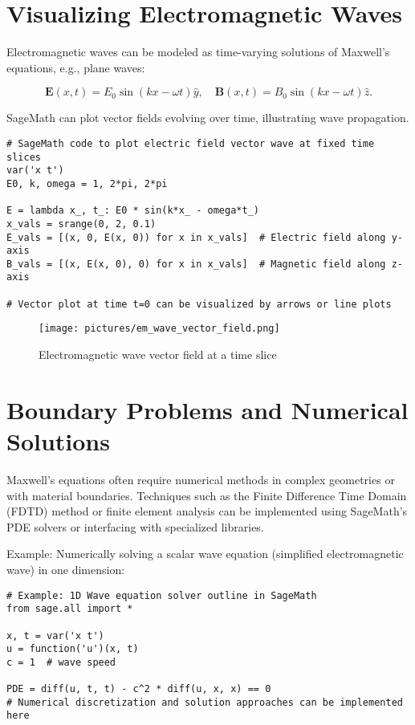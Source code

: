 \documentclass[12pt]{book}
\begin{document}
\section{Visualizing Electromagnetic Waves}

Electromagnetic waves can be modeled as time-varying solutions of Maxwell’s equations, e.g., plane waves:

\[
\mathbf{E}(x, t) = E_0 \sin(kx - \omega t) \hat{y}, \quad \mathbf{B}(x, t) = B_0 \sin(kx - \omega t) \hat{z}.
\]

SageMath can plot vector fields evolving over time, illustrating wave propagation.

\begin{verbatim}
# SageMath code to plot electric field vector wave at fixed time slices
var('x t')
E0, k, omega = 1, 2*pi, 2*pi

E = lambda x_, t_: E0 * sin(k*x_ - omega*t_)
x_vals = srange(0, 2, 0.1)
E_vals = [(x, 0, E(x, 0)) for x in x_vals]  # Electric field along y-axis
B_vals = [(x, E(x, 0), 0) for x in x_vals]  # Magnetic field along z-axis

# Vector plot at time t=0 can be visualized by arrows or line plots
\end{verbatim}

\begin{figure}[H]
  \centering
  \texttt{[image: pictures/em\_wave\_vector\_field.png]}
  \caption{Electromagnetic wave vector field at a time slice}
  \label{fig:em_wave_vector_field}
\end{figure}

\section{Boundary Problems and Numerical Solutions}

Maxwell’s equations often require numerical methods in complex geometries or with material boundaries. Techniques such as the Finite Difference Time Domain (FDTD) method or finite element analysis can be implemented using SageMath’s PDE solvers or interfacing with specialized libraries.

Example: Numerically solving a scalar wave equation (simplified electromagnetic wave) in one dimension:

\begin{verbatim}
# Example: 1D Wave equation solver outline in SageMath
from sage.all import *

x, t = var('x t')
u = function('u')(x, t)
c = 1  # wave speed

PDE = diff(u, t, t) - c^2 * diff(u, x, x) == 0
# Numerical discretization and solution approaches can be implemented here
\end{verbatim}
\end{document}
